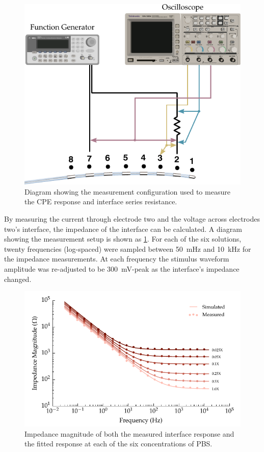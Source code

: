       \begin{figure}
          \centering
          \includegraphics[scale=0.95]{content/pt2/08-InterfaceParameters/graphics/measurement_CPE_setup}
          \caption{\label{fig:pt2-measurement_CPE_setup}Diagram showing the measurement configuration used to measure the CPE response and interface series resistance.}
      \end{figure}
      By measuring the current through electrode two and the voltage across electrodes two's interface, the impedance of the interface can be calculated.
      A diagram showing the measurement setup is shown as \cref{fig:pt2-measurement_CPE_setup}.
      For each of the six solutions, twenty frequencies (log-spaced) were sampled between \SI{50}{\milli\hertz} and \SI{10}{\kilo\hertz} for the impedance measurements.
      At each frequency the stimulus waveform amplitude was re-adjusted to be \SI{300}{\milli\volt}-peak as the interface's impedance changed.
      \begin{figure}
        \centering
        \includegraphics{content/pt2/08-InterfaceParameters/graphics/displacement_impedanceVsFrequency_magnitude_thesis}
        \caption{\label{fig:pt2-graph_impedanceVsFrequency_magnitude}Impedance magnitude of both the measured interface response and the fitted response at each of the six concentrations of PBS.}
      \end{figure}
